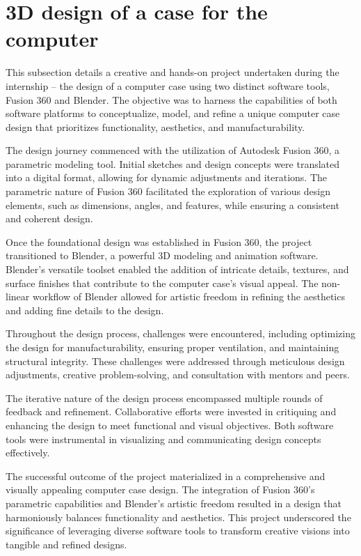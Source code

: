 \section{3D design of a case for the computer}
This subsection details a creative and hands-on project undertaken during the internship – the design of a computer case using two distinct software tools, Fusion 360 and Blender. The objective was to harness the capabilities of both software platforms to conceptualize, model, and refine a unique computer case design that prioritizes functionality, aesthetics, and manufacturability.

The design journey commenced with the utilization of Autodesk Fusion 360, a parametric modeling tool. Initial sketches and design concepts were translated into a digital format, allowing for dynamic adjustments and iterations. The parametric nature of Fusion 360 facilitated the exploration of various design elements, such as dimensions, angles, and features, while ensuring a consistent and coherent design.

Once the foundational design was established in Fusion 360, the project transitioned to Blender, a powerful 3D modeling and animation software. Blender's versatile toolset enabled the addition of intricate details, textures, and surface finishes that contribute to the computer case's visual appeal. The non-linear workflow of Blender allowed for artistic freedom in refining the aesthetics and adding fine details to the design.

Throughout the design process, challenges were encountered, including optimizing the design for manufacturability, ensuring proper ventilation, and maintaining structural integrity. These challenges were addressed through meticulous design adjustments, creative problem-solving, and consultation with mentors and peers.

The iterative nature of the design process encompassed multiple rounds of feedback and refinement. Collaborative efforts were invested in critiquing and enhancing the design to meet functional and visual objectives. Both software tools were instrumental in visualizing and communicating design concepts effectively.

The successful outcome of the project materialized in a comprehensive and visually appealing computer case design. The integration of Fusion 360's parametric capabilities and Blender's artistic freedom resulted in a design that harmoniously balances functionality and aesthetics. This project underscored the significance of leveraging diverse software tools to transform creative visions into tangible and refined designs.
